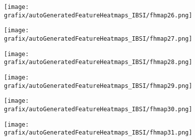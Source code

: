 \hspace{\hsp} 
\begin{subfigure}{\wid\textwidth} 
    \centering 
    \caption{\tiny \sffamily {}} 
    \vspace{\vsp} 
    \texttt{[image: grafix/autoGeneratedFeatureHeatmaps\_IBSI/fhmap26.png]} 
\end{subfigure} 
\hspace{\hsp} 
\begin{subfigure}{\wid\textwidth} 
    \centering 
    \caption{\tiny \sffamily {}} 
    \vspace{\vsp} 
    \texttt{[image: grafix/autoGeneratedFeatureHeatmaps\_IBSI/fhmap27.png]} 
\end{subfigure} 
\hspace{\hsp} 
\begin{subfigure}{\wid\textwidth} 
    \centering 
    \caption{\tiny \sffamily {}} 
    \vspace{\vsp} 
    \texttt{[image: grafix/autoGeneratedFeatureHeatmaps\_IBSI/fhmap28.png]} 
\end{subfigure} 
\hspace{\hsp} 
\begin{subfigure}{\wid\textwidth} 
    \centering 
    \caption{\tiny \sffamily {}} 
    \vspace{\vsp} 
    \texttt{[image: grafix/autoGeneratedFeatureHeatmaps\_IBSI/fhmap29.png]} 
\end{subfigure} 
\hspace{\hsp} 
\begin{subfigure}{\wid\textwidth} 
    \centering 
    \caption{\tiny \sffamily {}} 
    \vspace{\vsp} 
    \texttt{[image: grafix/autoGeneratedFeatureHeatmaps\_IBSI/fhmap30.png]} 
\end{subfigure} 
\hspace{\hsp} 
\begin{subfigure}{\wid\textwidth} 
    \centering 
    \caption{\tiny \sffamily {}} 
    \vspace{\vsp} 
    \texttt{[image: grafix/autoGeneratedFeatureHeatmaps\_IBSI/fhmap31.png]} 
\end{subfigure} 
\hspace{\hsp} 

